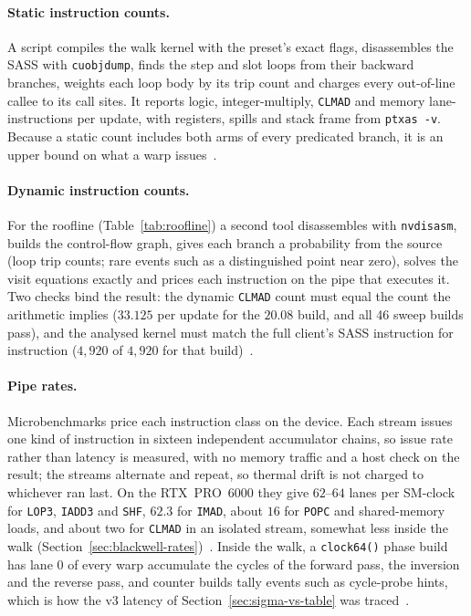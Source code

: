 \paragraph{Static instruction counts.} A script compiles the walk kernel
with the preset's exact flags, disassembles the SASS with
\texttt{cuobjdump}, finds the step and slot loops from their backward
branches, weights each loop body by its trip count and charges every
out-of-line callee to its call sites. It reports logic, integer-multiply,
\texttt{CLMAD} and memory lane-instructions per update, with registers,
spills and stack frame from \texttt{ptxas -v}. Because a static count
includes both arms of every predicated branch, it is an upper bound on
what a warp issues~.

\paragraph{Dynamic instruction counts.} For the roofline
(Table~\ref{tab:roofline}) a second tool disassembles with
\texttt{nvdisasm}, builds the control-flow graph, gives each branch a
probability from the source (loop trip counts; rare events such as a
distinguished point near zero), solves the visit equations exactly and
prices each instruction on the pipe that executes it. Two checks bind
the result: the dynamic \texttt{CLMAD} count must equal the count the
arithmetic implies ($33.125$ per update for the $20.08$ build, and all
46 sweep builds pass), and the analysed kernel must match the full
client's SASS instruction for instruction ($4{,}920$ of $4{,}920$ for
that build)~.

\paragraph{Pipe rates.} Microbenchmarks price each instruction class
on the device. Each stream issues one kind of instruction in sixteen
independent accumulator chains, so issue rate rather than latency is
measured, with no memory traffic and a host check on the result; the
streams alternate and repeat, so thermal drift is not charged to
whichever ran last. On the RTX~PRO~6000 they give $62$--$64$ lanes per
SM-clock for \texttt{LOP3}, \texttt{IADD3} and \texttt{SHF}, $62.3$ for
\texttt{IMAD}, about $16$ for \texttt{POPC} and shared-memory loads, and
about two for \texttt{CLMAD} in an isolated stream, somewhat less inside
the walk (Section~\ref{sec:blackwell-rates})~.
Inside the walk, a \texttt{clock64()} phase build has lane 0 of every
warp accumulate the cycles of the forward pass, the inversion and the
reverse pass, and counter builds tally events such as cycle-probe hints,
which is how the v3 latency of Section~\ref{sec:sigma-vs-table} was
traced~.

